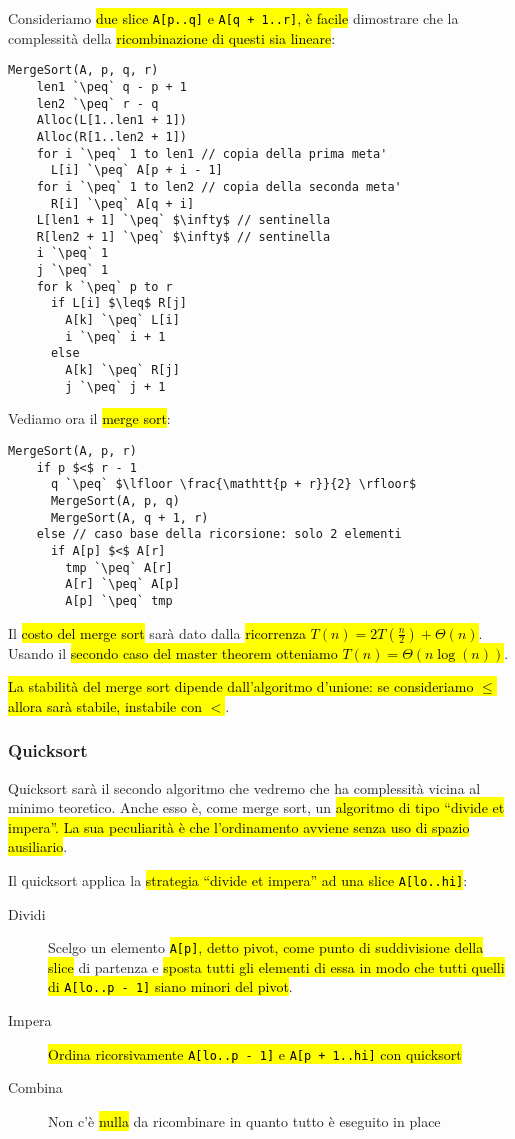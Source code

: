 \documentclass[a4paper,11pt,oneside]{article}
\theoremstyle{plain}
\theoremstyle{definition}
\theoremstyle{remark}
\newcommand{\peq}{$\gets$}
\begin{document}
Consideriamo \hl{due slice \texttt{A[p..q]} e \texttt{A[q + 1..r]}, è facile}
dimostrare che la complessità della \hl{ricombinazione di questi sia lineare}:

\begin{lstlisting}[language=pseudocodice,gobble=2]
  MergeSort(A, p, q, r)
    len1 `\peq` q - p + 1
    len2 `\peq` r - q
    Alloc(L[1..len1 + 1])
    Alloc(R[1..len2 + 1])
    for i `\peq` 1 to len1 // copia della prima meta'
      L[i] `\peq` A[p + i - 1]
    for i `\peq` 1 to len2 // copia della seconda meta'
      R[i] `\peq` A[q + i]
    L[len1 + 1] `\peq` $\infty$ // sentinella
    R[len2 + 1] `\peq` $\infty$ // sentinella
    i `\peq` 1
    j `\peq` 1
    for k `\peq` p to r
      if L[i] $\leq$ R[j]
        A[k] `\peq` L[i]
        i `\peq` i + 1
      else
        A[k] `\peq` R[j]
        j `\peq` j + 1
\end{lstlisting}

Vediamo ora il \hl{merge sort}:

\begin{lstlisting}[language=pseudocodice,gobble=2]
  MergeSort(A, p, r)
    if p $<$ r - 1
      q `\peq` $\lfloor \frac{\mathtt{p + r}}{2} \rfloor$
      MergeSort(A, p, q)
      MergeSort(A, q + 1, r)
    else // caso base della ricorsione: solo 2 elementi
      if A[p] $<$ A[r]
        tmp `\peq` A[r]
        A[r] `\peq` A[p]
        A[p] `\peq` tmp
\end{lstlisting}

Il \hl{costo del merge sort} sarà dato dalla \hl{ricorrenza $T(n) =
2T(\frac{n}{2}) + \Theta(n)$}. Usando il \hl{secondo caso del master theorem
otteniamo $T(n) = \Theta(n\log(n))$}.

\hl{La stabilità del merge sort dipende dall'algoritmo d'unione: se consideriamo
$\leq$ allora sarà stabile, instabile con $<$}.

\subsubsection{Quicksort}\label{sec:quicksort}

Quicksort sarà il secondo algoritmo che vedremo che ha complessità vicina al
minimo teoretico. Anche esso è, come merge sort, un\hl{ algoritmo di tipo
``divide et impera''. La sua peculiarità è che l'ordinamento avviene senza uso
di spazio ausiliario}.

Il quicksort applica la \hl{strategia ``divide et impera'' ad una slice
\texttt{A[lo..hi]}}:

\begin{description}
  \item[Dividi] Scelgo un elemento \hl{\texttt{A[p]}, detto pivot, come punto di
    suddivisione della slice} di partenza e \hl{sposta tutti gli elementi di
    essa in modo che tutti quelli di \texttt{A[lo..p - 1]} siano minori del %
    pivot}.
  \item[Impera] \hl{Ordina ricorsivamente \texttt{A[lo..p - 1]} e %
    \texttt{A[p + 1..hi]} con quicksort}
  \item[Combina] Non c'è \hl{nulla} da ricombinare in quanto tutto è eseguito in
    place
\end{description}
\end{document}
